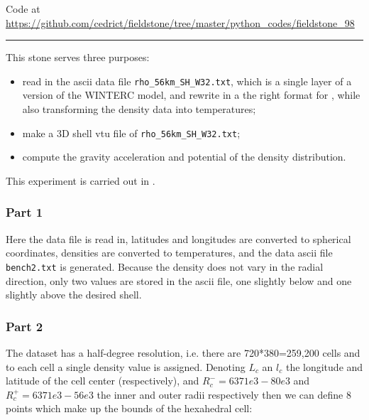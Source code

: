 

\begin{center}
Code at \url{https://github.com/cedrict/fieldstone/tree/master/python_codes/fieldstone_98}
\end{center}

\par\noindent\rule{\textwidth}{0.4pt}


This stone serves three purposes:
\begin{itemize}
\item read in the ascii data file {\tt rho\_56km\_SH\_W32.txt}, which is a 
single layer of a version of the WINTERC model, and rewrite in a the right format 
for \aspect{}, while also transforming the density data into temperatures;
\item make a 3D shell vtu file of {\tt rho\_56km\_SH\_W32.txt};
\item compute the gravity acceleration and potential of the density distribution. 
\end{itemize}
This experiment is carried out in \textcite{ross22}.

\subsubsection*{Part 1}

Here the data file is read in, latitudes and longitudes are 
converted to spherical coordinates, densities
are converted to temperatures, and the \aspect{} data ascii
file {\tt bench2.txt} is generated.
Because the density does not vary in the radial direction, only two values are stored in the ascii file, 
one slightly below and one slightly above the desired shell.

\subsubsection*{Part 2}

The dataset has a half-degree resolution, i.e.
there are 720*380=259,200 cells and to each cell a single density
value is assigned. Denoting $L_c$ an $l_c$ the longitude and latitude
of the cell center (respectively), and $R^-_c=6371e3-80e3$ and 
$R^+_c=6371e3-56e3$ the inner and outer radii respectively then we can 
define 8 points which make up the bounds of the hexahedral cell:

